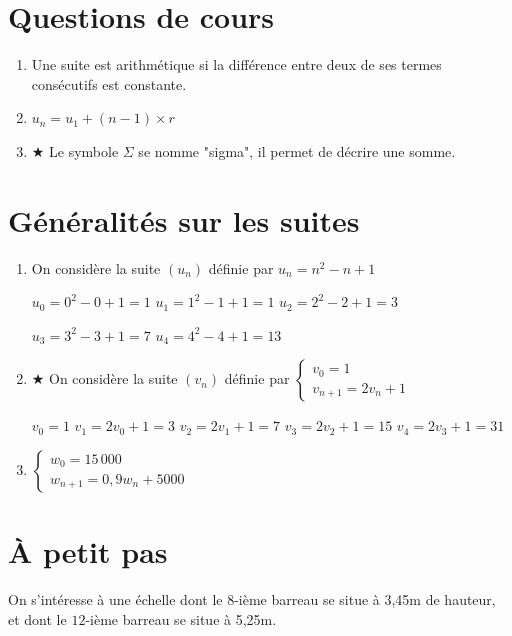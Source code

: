\documentclass[oneside,12pt]{exam}          %
\begin{document}
\newpage
\setcounter{section}{0}
\color{newblue}



\section{Questions de cours}
\begin{enumerate}[itemsep = 0pt]
	\item Une suite est arithmétique si la différence entre deux de ses termes consécutifs est constante.
	\item $u_n = u_1 + (n-1) \times r$
	\item $\bigstar$ Le symbole $\Sigma$ se nomme "sigma", il permet de décrire une somme.
\end{enumerate}



\section{Généralités sur les suites}
\begin{enumerate}[itemsep = 0pt]
	\item On considère la suite $(u_n)$ définie par $u_n = n^2 - n + 1$ 
	
	$u_0 = 0^2 - 0 + 1 = 1$ \qquad $u_1 = 1^2 - 1 + 1 = 1$ \qquad $u_2 = 2^2 - 2 + 1 = 3$ 
	
	$u_3 = 3^2 - 3 + 1 = 7$ \qquad $u_4 = 4^2 - 4 + 1 = 13$
	
	\item $\bigstar$ On considère la suite $(v_n)$ définie par $\begin{cases} v_0 = 1 \\ v_{n+1} = 2v_n +1 \end{cases}$ 
	
	$v_0 = 1$ \qquad $v_1 = 2v_0 + 1 = 3$ \qquad $v_2 = 2v_1 + 1 = 7$ \qquad
	$v_3 = 2v_2 + 1 = 15$ \qquad $v_4 = 2v_3 + 1 = 31$
	
	\item $\begin{cases}w_0 = 15\,000 \\ w_{n+1} = 0,9w_n + 5000 \end{cases}$
\end{enumerate}



\section{À petit pas}
On s'intéresse à une échelle dont le $8$-ième barreau se situe à 3,45m de hauteur, et dont le $12$-ième barreau se situe à 5,25m.
\end{document}

